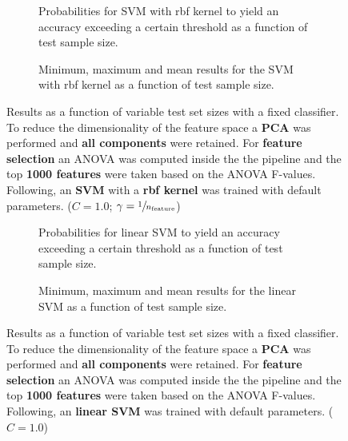 \begin{figure}
    \captionsetup[subfigure]{justification=justified,singlelinecheck=false}
    \begin{subfigure}[t]{0.61\textwidth}
        
        \caption{Probabilities for SVM with rbf kernel to yield an accuracy exceeding a certain threshold as a function of test sample size.}
    \end{subfigure}
    \hspace{3.0mm}
    \begin{subfigure}[t]{0.34\textwidth}
        
        \caption{Minimum, maximum and mean results for the SVM with rbf kernel as a function of test sample size.}
    \end{subfigure}
    \caption[Effects of varying test sample size. SVM (kernel = rbf); Preprocessing: PCA ($n_\text{components} = \text{all}$); ANOVA feature selection ($k_\text{best} = \num{1000}$)]{Results as a function of variable test set sizes with a fixed classifier. To reduce the dimensionality of the feature space a \textbf{PCA} was performed and \textbf{all components} were retained. For \textbf{feature selection} an ANOVA was computed inside the the pipeline and the top \textbf{\num{1000} features} were taken based on the ANOVA F-values. Following, an \textbf{{SVM}} with a \textbf{{rbf kernel}} was trained with default parameters. ($C=\num{1.0}$; $\gamma=\sfrac{1}{n_\text{feature}}$)}
    \label{fig:PCA_all_components_1000_best_selected_SVC}
\end{figure}

\begin{figure}
    \captionsetup[subfigure]{justification=justified,singlelinecheck=false}
    \begin{subfigure}[t]{0.61\textwidth}
        
        \caption{Probabilities for linear SVM to yield an accuracy exceeding a certain threshold as a function of test sample size.}
    \end{subfigure}
    \hspace{3.0mm}
    \begin{subfigure}[t]{0.34\textwidth}
        
        \caption{Minimum, maximum and mean results for the linear SVM as a function of test sample size.}
    \end{subfigure}
    \caption[Effects of varying test sample size. Linear SVM; Preprocessing: PCA ($n_\text{components} = \text{all}$); ANOVA feature selection ($k_\text{best} = \num{1000}$)]{Results as a function of variable test set sizes with a fixed classifier. To reduce the dimensionality of the feature space a \textbf{PCA} was performed and \textbf{all components} were retained. For \textbf{feature selection} an ANOVA was computed inside the the pipeline and the top \textbf{\num{1000} features} were taken based on the ANOVA F-values. Following, an \textbf{{linear SVM}} was trained with default parameters. ($C=\num{1.0}$)}
    \label{fig:PCA_all_components_1000_best_selected_LinearSVC}
\end{figure}
